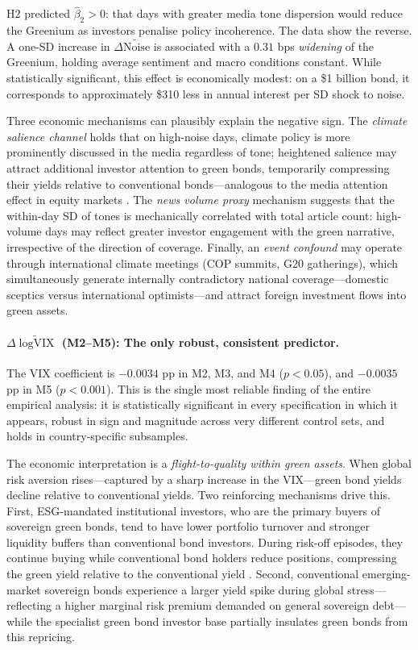 \documentclass[12pt,a4paper]{article}
\begin{document}
H2 predicted $\hat{\beta}_2 > 0$: that days with greater media tone dispersion would reduce the Greenium as investors penalise policy incoherence. The data show the reverse. A one-SD increase in $\Delta\widetilde{\text{Noise}}$ is associated with a $0.31$ bps \textit{widening} of the Greenium, holding average sentiment and macro conditions constant. While statistically significant, this effect is economically modest: on a \$1 billion bond, it corresponds to approximately \$310 less in annual interest per SD shock to noise.

Three economic mechanisms can plausibly explain the negative sign. The \textit{climate salience channel} holds that on high-noise days, climate policy is more prominently discussed in the media regardless of tone; heightened salience may attract additional investor attention to green bonds, temporarily compressing their yields relative to conventional bonds---analogous to the media attention effect in equity markets \citep{Tetlock2007}. The \textit{news volume proxy} mechanism suggests that the within-day SD of tones is mechanically correlated with total article count: high-volume days may reflect greater investor engagement with the green narrative, irrespective of the direction of coverage. Finally, an \textit{event confound} may operate through international climate meetings (COP summits, G20 gatherings), which simultaneously generate internally contradictory national coverage---domestic sceptics versus international optimists---and attract foreign investment flows into green assets.

\paragraph{$\Delta\widetilde{\log\text{VIX}}$ (M2--M5): The only robust, consistent predictor.}

The VIX coefficient is $-0.0034$ pp in M2, M3, and M4 ($p < 0.05$), and $-0.0035$ pp in M5 ($p < 0.001$). This is the single most reliable finding of the entire empirical analysis: it is statistically significant in every specification in which it appears, robust in sign and magnitude across very different control sets, and holds in country-specific subsamples.

The economic interpretation is a \textit{flight-to-quality within green assets}. When global risk aversion rises---captured by a sharp increase in the VIX---green bond yields decline relative to conventional yields. Two reinforcing mechanisms drive this. First, ESG-mandated institutional investors, who are the primary buyers of sovereign green bonds, tend to have lower portfolio turnover and stronger liquidity buffers than conventional bond investors. During risk-off episodes, they continue buying while conventional bond holders reduce positions, compressing the green yield relative to the conventional yield \citep{Baker2022}. Second, conventional emerging-market sovereign bonds experience a larger yield spike during global stress---reflecting a higher marginal risk premium demanded on general sovereign debt---while the specialist green bond investor base partially insulates green bonds from this repricing.
\end{document}
